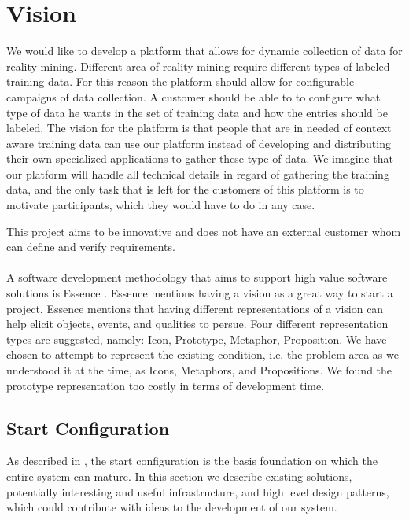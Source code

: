 
\section{Vision}
\label{sec:vision}

We would like to develop a platform that allows for dynamic collection of data for reality mining. Different area of reality mining require different types of labeled training data. For this reason the platform should allow for configurable campaigns of data collection. A customer should be able to to configure what type of data he wants in the set of training data and how the entries should be labeled. The vision for the platform is that people that are in needed of context aware training data can use our platform instead of developing and distributing their own specialized applications to gather these type of data. We imagine that our platform will handle all technical details in regard of gathering the training data, and the only task that is left for the customers of this platform is to motivate participants, which they would have to do in any case.


This project aims to be innovative and does not have an external customer whom can define and verify requirements. 
\\\\
A software development methodology that aims to support high value software solutions is Essence \parencite{essence_book_2016_draft}. Essence mentions having a vision as a great way to start a project. Essence mentions that having different representations of a vision can help elicit objects, events, and qualities to persue. Four different representation types are suggested, namely: Icon, Prototype, Metaphor, Proposition. We have chosen to attempt to represent the existing condition, i.e. the problem area as we understood it at the time, as Icons, Metaphors, and Propositions. We found the prototype representation too costly in terms of development time. 

\subsection{Start Configuration}
\label{sub:start_configuration}

As described in , the start configuration is the basis foundation on which the entire system can mature. In this section we describe existing solutions, potentially interesting and useful infrastructure, and high level design patterns, which could contribute with ideas to the development of our system.

